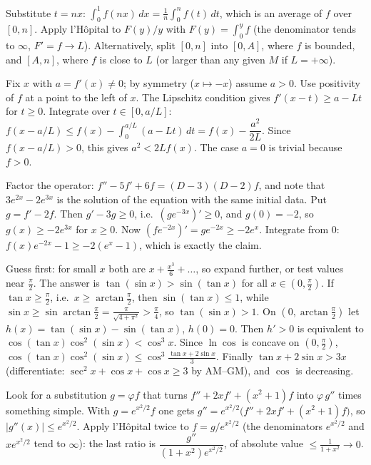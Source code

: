 \documentclass[11pt,a4paper]{article}
\begin{document}

 Substitute $t=nx$: $\displaystyle\int_0^1 f(nx)\,dx=\frac1n\int_0^n f(t)\,dt$, which is an average of $f$ over $[0,n]$.
 Apply l'H\^opital to $F(y)/y$ with $F(y)=\int_0^y f$ (the denominator tends to $\infty$, $F'=f\to L$). Alternatively, split $[0,n]$ into $[0,A]$, where $f$ is bounded, and $[A,n]$, where $f$ is close to $L$ (or larger than any given $M$ if $L=+\infty$).

 Fix $x$ with $a=f'(x)\ne0$; by symmetry ($x\mapsto -x$) assume $a>0$. Use positivity of $f$ at a point to the left of $x$.
 The Lipschitz condition gives $f'(x-t)\ge a-Lt$ for $t\ge0$. Integrate over $t\in[0,a/L]$:
$f(x-a/L)\le f(x)-\int_0^{a/L}(a-Lt)\,dt=f(x)-\dfrac{a^2}{2L}$.
 Since $f(x-a/L)>0$, this gives $a^2<2Lf(x)$. The case $a=0$ is trivial because $f>0$.

 Factor the operator: $f''-5f'+6f=(D-3)(D-2)f$, and note that $3e^{2x}-2e^{3x}$ is the solution of the equation with the same initial data.
 Put $g=f'-2f$. Then $g'-3g\ge0$, i.e.\ $(ge^{-3x})'\ge0$, and $g(0)=-2$, so $g(x)\ge-2e^{3x}$ for $x\ge0$.
 Now $(fe^{-2x})'=ge^{-2x}\ge-2e^{x}$. Integrate from $0$: $f(x)e^{-2x}-1\ge-2(e^x-1)$, which is exactly the claim.

 Guess first: for small $x$ both are $x+\frac{x^3}{6}+\dots$, so expand further, or test values near $\frac\pi2$. The answer is $\tan(\sin x)>\sin(\tan x)$ for all $x\in(0,\frac\pi2)$.
 If $\tan x\ge\frac\pi2$, i.e.\ $x\ge\arctan\frac\pi2$, then $\sin(\tan x)\le1$, while $\sin x\ge\sin\arctan\frac\pi2=\frac{\pi}{\sqrt{4+\pi^2}}>\frac\pi4$, so $\tan(\sin x)>1$.
 On $(0,\arctan\frac\pi2)$ let $h(x)=\tan(\sin x)-\sin(\tan x)$, $h(0)=0$. Then $h'>0$ is equivalent to $\cos(\tan x)\cos^2(\sin x)<\cos^3x$.
 Since $\ln\cos$ is concave on $(0,\frac\pi2)$, $\cos(\tan x)\cos^2(\sin x)\le\cos^3\frac{\tan x+2\sin x}{3}$. Finally $\tan x+2\sin x>3x$ (differentiate: $\sec^2x+\cos x+\cos x\ge3$ by AM--GM), and $\cos$ is decreasing.

 Look for a substitution $g=\varphi f$ that turns $f''+2xf'+(x^2+1)f$ into $\varphi\,g''$ times something simple.
 With $g=e^{x^2/2}f$ one gets $g''=e^{x^2/2}\bigl(f''+2xf'+(x^2+1)f\bigr)$, so $|g''(x)|\le e^{x^2/2}$.
 Apply l'H\^opital twice to $f=g/e^{x^2/2}$ (the denominators $e^{x^2/2}$ and $xe^{x^2/2}$ tend to $\infty$): the last ratio is $\dfrac{g''}{(1+x^2)e^{x^2/2}}$, of absolute value $\le\frac1{1+x^2}\to0$.
\end{document}
